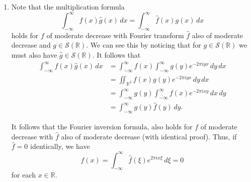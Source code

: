 \documentclass[12 pt, letterpaper]{hmcpset}
\begin{document}
\begin{solution}
\begin{enumerate}
			To show that $\hat{f}$ satisfies the decay property, we can use the fact that
			\[
				\int_{-\infty}^{\infty} f\left ( x - {1}/{2 \xi} \right ) e^{-2 \pi i x \xi} \, dx = \hat{f}(\xi) e^{-2 \pi i (1/2 \xi) \xi} = - \hat{f}(\xi).
			\]
			It follows then that
			\[
				\hat{f}(\xi) = \frac{1}{2} \int_{-\infty}^{\infty} (f(x) - f(x - 1/2 \xi)) e^{-2 \pi i x \xi} \, dx.
			\]

			This expression allows us to bound $\hat{f}(\xi)$ for large $\xi$. Note that since $f$ is of moderated decrease and continuous, it is uniformly continuous. Thus, as $\lvert \xi \rvert \to \infty$, the convergence $\lvert f(x) - f(x - 1/2 \xi) \rvert \to 0$ is uniform in $x$ --- given any $\varepsilon > 0$, there is a sufficiently large $\lvert \xi \rvert$ such that
			\[
				\lvert \hat{f}(\xi) \rvert \le \frac{1}{2} \lvert e^{-2 \pi i x \xi} \rvert \int_{-\infty}^{\infty} \lvert f(x) - f(x - 1/2\xi)\rvert \, dx
			\]
			which goes to zero since the improper integral is ``continuous''.

		\item Note that the multiplication formula
			\[
				\int_{-\infty}^{\infty} f(x) \hat{g}(x) \, dx = \int_{-\infty}^{\infty} \hat{f}(x) g(x) \, dx
			\]
			holds for $f$ of moderate decrease with Fourier transform $\hat{f}$ also of moderate decrease and $g \in \mathcal{S}(\mathbb{R})$. We can see this by noticing that for $g \in \mathcal{S}(\mathbb{R})$ we must also have $\hat{g} \in \mathcal{S}(\mathbb{R})$. It follows that
			\begin{align*}
				\int_{-\infty}^{\infty} f(x) \hat{g}(x) \, dx & = \int_{-\infty}^{\infty} f(x) \int_{-\infty}^{\infty} g(y) e^{-2 \pi i y x} \, dy  \, dx \\
									      & = \iint_{\mathbb{R}^{2}} f(x) g(y) e^{-2 \pi i y x} \, dy \, dx \\
									      & = \int_{-\infty}^{\infty} g(y) \int_{-\infty}^{\infty} f(x) e^{-2 \pi i x y} \, dx  \, dy \\
									      & = \int_{-\infty}^{\infty} g(y) \hat{f}(y) \, dy.
			\end{align*}

			It follows that the Fourier inversion formula, also holds for $f$ of moderate decrease with $\hat{f}$ also of moderate decrease (with identical proof). Thus, if $\hat{f} = 0$ identically, we have
			\[
				f(x) = \int_{-\infty}^{\infty} \hat{f}(\xi) e^{2 \pi i x \xi} \, d\xi = 0
			\]
			for each $x \in \mathbb{R}$.
	\end{enumerate}
\end{solution}
 
\end{document}
